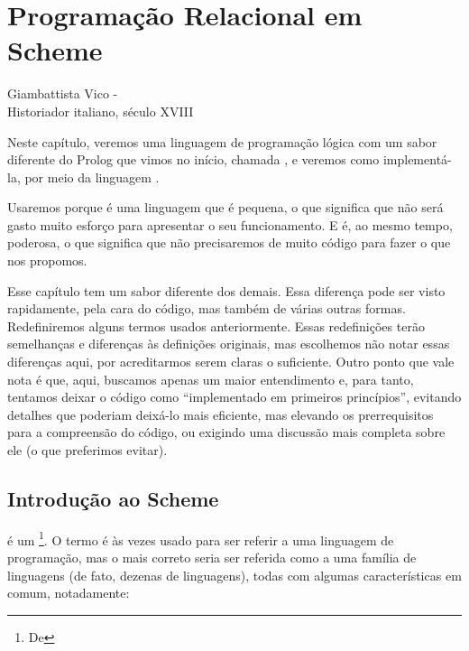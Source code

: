 
%

%

\section{Programação Relacional em Scheme}

\epigraph{}{Giambattista Vico - \\Historiador italiano, século XVIII}


Neste capítulo, veremos uma linguagem de programação lógica com um
sabor diferente do Prolog que vimos no início, chamada
, e veremos como implementá-la, por meio da
linguagem .

Usaremos  porque é uma linguagem que é pequena, o
que significa que não será gasto muito esforço para apresentar o seu
funcionamento. E é, ao mesmo tempo, poderosa, o que significa que não
precisaremos de muito código para fazer o que nos propomos.

Esse capítulo tem um sabor diferente dos demais. Essa diferença pode ser visto
rapidamente, pela cara do código, mas também de várias outras
formas. Redefiniremos alguns termos usados anteriormente. Essas
redefinições terão semelhanças e diferenças às definições originais,
mas escolhemos não notar essas diferenças aqui, por acreditarmos serem
claras o suficiente. Outro ponto que vale nota é que, aqui, buscamos
apenas um maior entendimento e, para tanto, tentamos deixar o código
como ``implementado em primeiros princípios'', evitando detalhes que
poderiam deixá-lo mais eficiente, mas elevando os prerrequisitos para
a compreensão do código, ou exigindo uma discussão mais completa sobre
ele (o que preferimos evitar).

\subsection{Introdução ao Scheme}

 é um \footnote{De
  }. O termo  é às vezes
usado para ser referir a uma linguagem de programação, mas o mais
correto seria ser referida como a uma família de linguagens (de fato,
dezenas de linguagens), todas com algumas características em comum,
notadamente:

